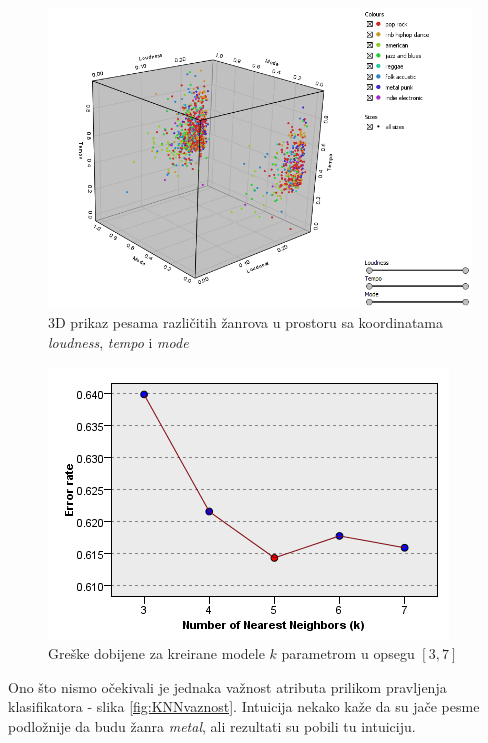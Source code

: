 \begin{figure}[H]
    \centering
    \includegraphics[scale=0.6]{resources/genre_scatter.PNG}
    \caption{3D prikaz pesama razli\v{c}itih \v{z}anrova u prostoru sa koordinatama \emph{loudness}, \emph{tempo} i \emph{mode}}
    \label{fig:ZanrKlasifikacija}
\end{figure}

\begin{figure}[H]
    \centering
    \includegraphics{resources/KNN_errors.PNG}
    \caption{Gre\v{s}ke dobijene za kreirane modele $k$ parametrom u opsegu $[3,7]$}
    \label{fig:KNNgreske}
\end{figure}

Ono \v{s}to nismo o\v{c}ekivali je jednaka va\v{z}nost atributa prilikom pravljenja klasifikatora - slika \ref{fig:KNNvaznost}. Intuicija nekako ka\v{z}e da su ja\v{c}e pesme podlo\v{z}nije da budu \v{z}anra \emph{metal}, ali rezultati su pobili tu intuiciju.

